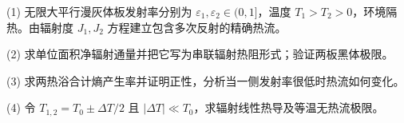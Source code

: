 (1) 无限大平行漫灰体板发射率分别为 \(\varepsilon_1,\varepsilon_2\in(0,1]\)，温度 \(T_1>T_2>0\)，环境隔热。由辐射度 \(J_1,J_2\) 方程建立包含多次反射的精确热流。

(2) 求单位面积净辐射通量并把它写为串联辐射热阻形式；验证两板黑体极限。

(3) 求两热浴合计熵产生率并证明正性，分析当一侧发射率很低时热流如何变化。

(4) 令 \(T_{1,2}=T_0\pm\Delta T/2\) 且 \(|\Delta T|\ll T_0\)，求辐射线性热导及等温无热流极限。
